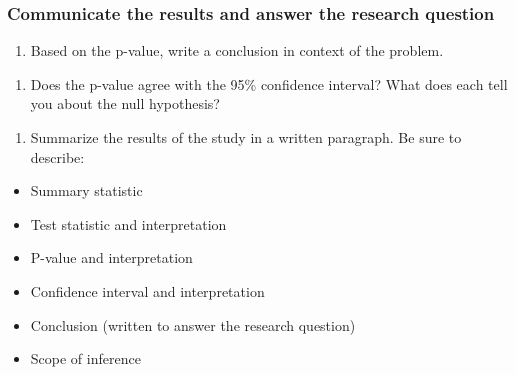 \documentclass[
]{report}
\providecommand{\tightlist}{%
  \setlength{\itemsep}{0pt}\setlength{\parskip}{0pt}}
\begin{document}
\vspace{1in}

\hypertarget{communicate-the-results-and-answer-the-research-question-3}{%
\subsubsection*{Communicate the results and answer the research question}\label{communicate-the-results-and-answer-the-research-question-3}}

\begin{enumerate}
\def\labelenumi{\arabic{enumi}.}
\setcounter{enumi}{17}
\tightlist
\item
  Based on the p-value, write a conclusion in context of the problem.
\end{enumerate}

\vspace{1in}

\begin{enumerate}
\def\labelenumi{\arabic{enumi}.}
\setcounter{enumi}{18}
\tightlist
\item
  Does the p-value agree with the 95\% confidence interval? What does each tell you about the null hypothesis?
\end{enumerate}

\vspace{1in}

\begin{enumerate}
\def\labelenumi{\arabic{enumi}.}
\setcounter{enumi}{19}
\tightlist
\item
  Summarize the results of the study in a written paragraph. Be sure to describe:
\end{enumerate}

\begin{itemize}
\item
  Summary statistic
\item
  Test statistic and interpretation
\item
  P-value and interpretation
\item
  Confidence interval and interpretation
\item
  Conclusion (written to answer the research question)
\item
  Scope of inference
\end{itemize}

\vspace{3in}

\newpage
\end{document}

